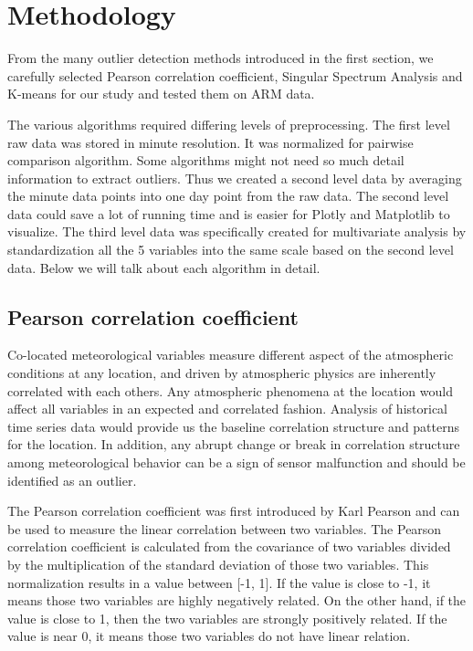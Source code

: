 \section{Methodology}
From the many outlier detection methods introduced in the first section,
we carefully selected Pearson correlation coefficient, Singular
Spectrum Analysis and K-means for our study and tested them on ARM data. 

The various algorithms required differing levels of preprocessing. The
first level raw data was stored in minute resolution. It was normalized
for pairwise comparison algorithm. Some algorithms might not need
so much detail information to extract outliers. Thus we created a
second level data by averaging the minute data points into one
day point from the raw data. The second level data could save a lot
of running time and is easier for Plotly \cite{plotly} and
Matplotlib \cite{Hunter:2007} to visualize. The third level data
was specifically created for multivariate analysis by standardization
all the 5 variables into the same scale based on the second level
data. Below we will talk about each algorithm in detail. 

\subsection{Pearson correlation coefficient}
Co-located meteorological variables measure different aspect of the
atmospheric conditions at any location, and driven by atmospheric physics
are inherently correlated with each others. Any atmospheric phenomena at
the location would affect all variables in an expected
and correlated fashion.  Analysis of historical time
series data would provide us the baseline correlation structure and
patterns for the location. In addition, any abrupt change or break in
correlation structure among meteorological behavior can be a sign of
sensor malfunction and should be identified as an outlier. 

The Pearson correlation coefficient was first introduced by Karl
Pearson\cite{pearson1895note} and can be used to measure the linear
correlation between two variables. The Pearson correlation coefficient
is calculated from the covariance of two variables divided by the
multiplication of the standard deviation of those two variables. This
normalization results in a value between [-1, 1]. If the value is close
to -1, it means those two variables are highly negatively related. On
the other hand, if the value is close to 1, then the two variables are strongly positively related.
If the value is near 0, it means those two variables do not have linear
relation. 

